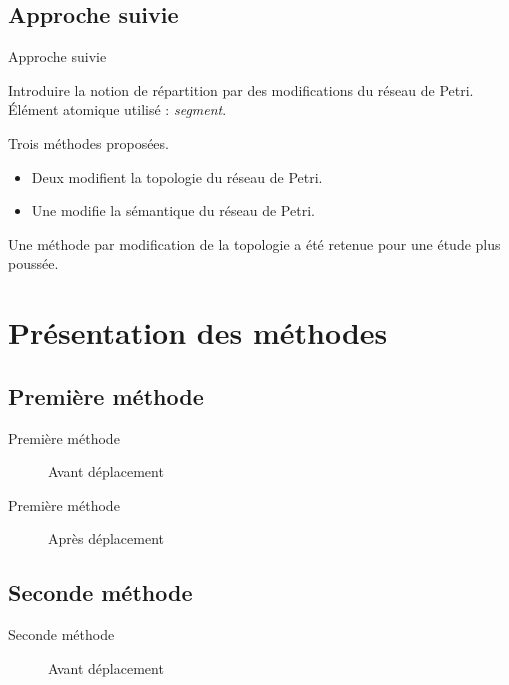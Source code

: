 \subsection{Approche suivie}
\begin{frame}{Approche suivie}
	\begin{itemize}
		\itemar Introduire la notion de répartition par des modifications du réseau de Petri.
		\itemar Élément atomique utilisé : \textit{segment}.
	\end{itemize}
	\vspace{1em}
	Trois méthodes proposées.
	\begin{itemize}
		\item Deux modifient la topologie du réseau de Petri.
		\item Une modifie la sémantique du réseau de Petri.
	\end{itemize}
	
	Une méthode par modification de la topologie a été retenue pour une étude plus poussée.
\end{frame}

\section{Présentation des méthodes}
\subsection{Première méthode}
\begin{frame}{Première méthode}
	\begin{figure}[h!]
		\centering
		
		\caption{Avant déplacement}
		\label{fig:deplacementMethode1}
	\end{figure}
\end{frame}

\begin{frame}{Première méthode}
	\begin{figure}[h!]
		\centering
		
		\caption{Après déplacement}
		\label{fig:deplacementMethode1-2}
	\end{figure}
\end{frame}

\subsection{Seconde méthode}
\begin{frame}{Seconde méthode}
	\begin{figure}[h!]
		\centering
		
		\caption{Avant déplacement}
		\label{fig:deplacementMethode2}
	\end{figure}
\end{frame}

